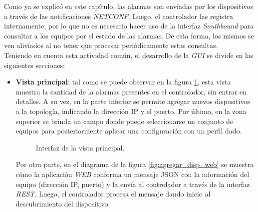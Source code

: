   Como ya se explicó en este capítulo, las alarmas son enviadas por los dispositivos a través de las notificaciones \textit{NETCONF}. Luego, el controlador las registra internamente, por lo que no es necesario hacer uso de la interfaz \textit{Southbound} para consultar a los equipos por el estado de las alarmas. De esta forma, los mismos se ven aliviados al no tener que procesar periódicamente estas consultas.
  \\

  Teniendo en cuenta esta actividad común, el desarrollo de la \textit{GUI} se divide en las siguientes secciones:

  \begin{itemize}
	\item \textbf{Vista principal}: tal como se puede observar en la figura \ref{fig:captura_web_principal}, esta vista muestra la cantidad de la alarmas presentes en el controlador, sin entrar en detalles. A su vez, en la parte inferior se permite agregar nuevos dispositivos a la topología, indicando la dirección IP y el puerto. Por último, en la zona superior se brinda un campo donde puede seleccionarse un conjunto de equipos para posteriormente aplicar una configuración con un perfil dado. 

    \begin{figure}[H]
        \centering
        \caption{Interfaz de la vista principal.}
        \label{fig:captura_web_principal}
      \end{figure}

    Por otra parte, en el diagrama de la figura \ref{fig:agregar_disp_web} se muestra cómo la aplicación \textit{WEB} conforma un mensaje JSON con la información del equipo (dirección IP, puerto) y la envía al controlador a través de la interfaz\textit{ REST}. Luego, el controlador procesa el mensaje dando inicio al descubrimiento del dispositivo. 


\end{itemize}
